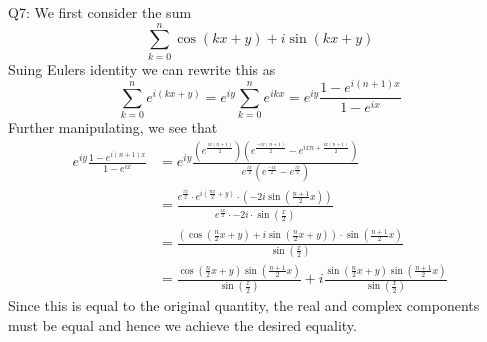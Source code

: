 \documentclass[letterpaper]{article}
\begin{document}
\noindent
Q7: We first consider the sum $$\sum_{k=0}^n \cos(kx+y) + i \sin(kx+y)$$
Suing Eulers identity we can rewrite this as $$\sum_{k=0}^n e^{i(kx+y)} = e^{iy}\sum_{k=0}^n e^{ikx} = e^{iy}\frac{1-e^{i(n+1)x}}{1-e^{ix}}$$
Further manipulating, we see that 
\begin{align*}
    e^{iy}\frac{1-e^{i(n+1)x}}{1-e^{ix}} & = e^{iy} \frac{(e^{\frac{ix(n+1)}{2}})(e^{\frac{-ix(n+1)}{2}}-e^{ixn + \frac{ix(n+1)}{2}})}{e^{\frac{ix}{2}}(e^{\frac{-ix}{2}} - e^{\frac{ix}{2}})}
    \\ & = \frac{e^{\frac{ix}{2}}\cdot e^{i(\frac{nx}{2} + y)} \cdot(-2i \sin(\frac{n+1}{2}x))}{e^{\frac{ix}{2}} \cdot -2i \cdot \sin(\frac{x}{2})}
    \\ & = \frac{(\cos(\frac{n}{2}x+y) + i\sin(\frac{n}{2}x+y)) \cdot \sin(\frac{n+1}{2}x)}{\sin(\frac{x}{2})}
    \\ & = \frac{\cos(\frac{n}{2}x+y) \sin(\frac{n+1}{2}x)}{\sin(\frac{x}{2})} + i \frac{\sin(\frac{n}{2}x+y) \sin(\frac{n+1}{2}x)}{\sin(\frac{x}{2})}
\end{align*} 
Since this is equal to the original quantity, the real and complex components must be equal and hence we achieve the desired equality. 
\end{document}
